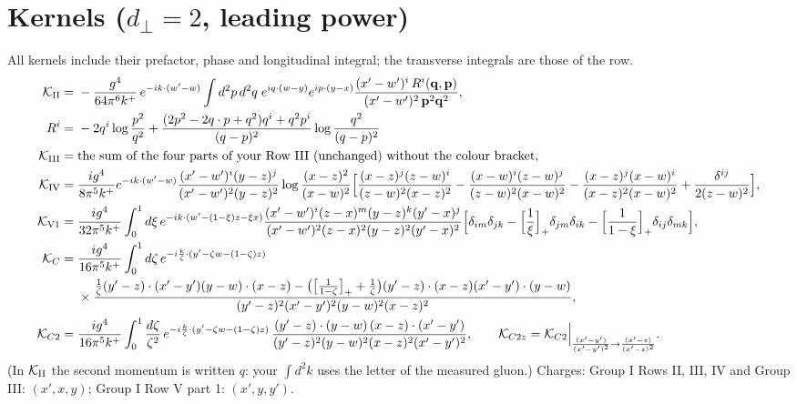 \documentclass[10pt]{article}
\numberwithin{equation}{section}
\begin{document}
\section{Kernels ($d_\perp=2$, leading power)}\label{GS:sec:kern}
All kernels include their prefactor, phase and longitudinal integral; the transverse integrals are those of the row.
\begin{align}
\mathcal K_{\rm II}={}&-\frac{g^4}{64\pi^6k^+}\,e^{-ik\cdot(w'-w)}\int d^2p\,d^2q\;e^{iq\cdot(w-y)}e^{ip\cdot(y-x)}\frac{(x'-w')^i\,R^i(\mathbf q,\mathbf p)}{(x'-w')^2\,\mathbf p^2\mathbf q^2},\notag\\ R^i={}&-2q^i\log\frac{p^2}{q^2}+\frac{(2p^2-2q\cdot p+q^2)q^i+q^2p^i}{(q-p)^2}\log\frac{q^2}{(q-p)^2}\\
\mathcal K_{\rm III}={}&\text{the sum of the four parts of your Row III (unchanged) without the colour bracket},\\
\mathcal K_{\rm IV}={}&\frac{ig^4}{8\pi^5k^+}e^{-ik\cdot(w'-w)}\frac{(x'-w')^{i}(y-z)^{j}}{(x'-w')^{2}(y-z)^{2}}\log\frac{(x-z)^{2}}{(x-w)^{2}}\Big[\frac{(x-z)^{j}(z-w)^{i}}{(z-w)^{2}(x-z)^{2}}-\frac{(x-w)^{i}(z-w)^{j}}{(z-w)^{2}(x-w)^{2}}-\frac{(x-z)^{j}(x-w)^{i}}{(x-z)^{2}(x-w)^{2}}+\frac{\delta^{ij}}{2(z-w)^{2}}\Big],\\
\mathcal K_{\rm V1}={}&\frac{ig^4}{32\pi^5k^+}\int_0^1d\xi\,e^{-ik\cdot(w'-(1-\xi)z-\xi x)}\frac{(x'-w')^{i}(z-x)^{m}(y-z)^{k}(y'-x)^{j}}{(x'-w')^{2}(z-x)^{2}(y-z)^{2}(y'-x)^{2}}\Big[\delta_{im}\delta_{jk}-\Big[\frac1\xi\Big]_+\delta_{jm}\delta_{ik}-\Big[\frac{1}{1-\xi}\Big]_+\delta_{ij}\delta_{mk}\Big],\\
\mathcal K_{C}={}&\frac{ig^4}{16\pi^5k^+}\int_0^1d\zeta\,e^{-i\frac{k}{\zeta}\cdot(y'-\zeta w-(1-\zeta)z)}\notag\\&\times\frac{\frac1\zeta(y'-z)\cdot(x'-y')(y-w)\cdot(x-z)-\big(\big[\frac1{1-\zeta}\big]_++\frac1\zeta\big)(y'-z)\cdot(x-z)(x'-y')\cdot(y-w)}{(y'-z)^{2}(x'-y')^{2}(y-w)^{2}(x-z)^{2}},\\
\mathcal K_{C2}={}&\frac{ig^4}{16\pi^5k^+}\int_0^1\frac{d\zeta}{\zeta^2}\,e^{-i\frac{k}{\zeta}\cdot(y'-\zeta w-(1-\zeta)z)}\,\frac{(y'-z)\cdot(y-w)\,(x-z)\cdot(x'-y')}{(y'-z)^{2}(y-w)^{2}(x-z)^{2}(x'-y')^{2}},\qquad
\mathcal K_{C2z}=\mathcal K_{C2}\Big|_{\frac{(x'-y')}{(x'-y')^2}\to\frac{(x'-z)}{(x'-z)^2}}.
\end{align}
(In $\mathcal K_{\rm II}$ the second momentum is written $q$: your $\int d^2k$ uses the letter of the measured gluon.) Charges: Group I Rows II, III, IV and Group III: $(x',x,y)$; Group I Row V part 1: $(x',y,y')$.
\end{document}
